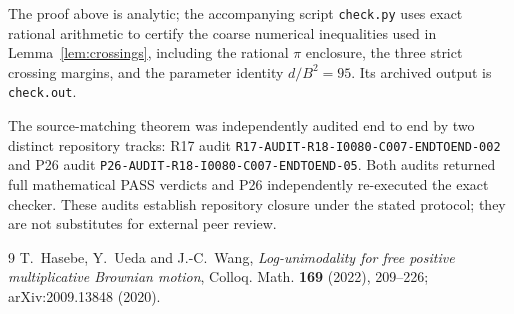 \documentclass[11pt]{article}
\begin{document}
The proof above is analytic; the accompanying script \texttt{check.py} uses exact rational arithmetic to certify the coarse numerical inequalities used in Lemma~\ref{lem:crossings}, including the rational $\pi$ enclosure, the three strict crossing margins, and the parameter identity $d/B^2=95$. Its archived output is \texttt{check.out}.

The source-matching theorem was independently audited end to end by two distinct repository tracks: R17 audit \texttt{R17-AUDIT-R18-I0080-C007-ENDTOEND-002} and P26 audit \texttt{P26-AUDIT-R18-I0080-C007-ENDTOEND-05}. Both audits returned full mathematical PASS verdicts and P26 independently re-executed the exact checker. These audits establish repository closure under the stated protocol; they are not substitutes for external peer review.

\begin{thebibliography}{9}
T.~Hasebe, Y.~Ueda and J.-C.~Wang,
\emph{Log-unimodality for free positive multiplicative Brownian motion},
Colloq. Math. \textbf{169} (2022), 209--226;
arXiv:2009.13848 (2020).
\end{thebibliography}
\end{document}
